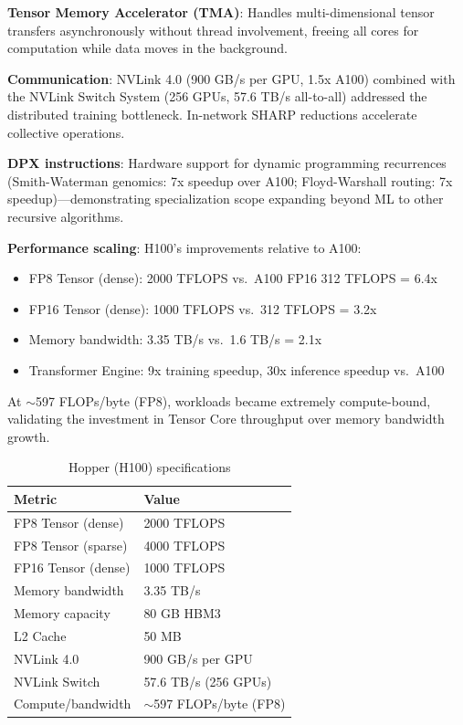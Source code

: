 \documentclass{article}
\begin{document}
\textbf{Tensor Memory Accelerator (TMA)}: Handles multi-dimensional tensor transfers asynchronously without thread involvement, freeing all cores for computation while data moves in the background.

\textbf{Communication}: NVLink 4.0 (900 GB/s per GPU, 1.5x A100) combined with the NVLink Switch System (256 GPUs, 57.6 TB/s all-to-all) addressed the distributed training bottleneck. In-network SHARP reductions accelerate collective operations.

\textbf{DPX instructions}: Hardware support for dynamic programming recurrences (Smith-Waterman genomics: 7x speedup over A100; Floyd-Warshall routing: 7x speedup)—demonstrating specialization scope expanding beyond ML to other recursive algorithms.

\textbf{Performance scaling}: H100's improvements relative to A100:
\begin{itemize}
\item FP8 Tensor (dense): 2000 TFLOPS vs.\ A100 FP16 312 TFLOPS = 6.4x
\item FP16 Tensor (dense): 1000 TFLOPS vs.\ 312 TFLOPS = 3.2x
\item Memory bandwidth: 3.35 TB/s vs.\ 1.6 TB/s = 2.1x
\item Transformer Engine: 9x training speedup, 30x inference speedup vs.\ A100 \cite{nvidia2022h100performance}
\end{itemize}
At $\sim$597 FLOPs/byte (FP8), workloads became extremely compute-bound, validating the investment in Tensor Core throughput over memory bandwidth growth.

\begin{table}[h]
\centering\small
\begin{tabular}{ll}
\toprule
Metric & Value \\
\midrule
FP8 Tensor (dense) & 2000 TFLOPS \\
FP8 Tensor (sparse) & 4000 TFLOPS \\
FP16 Tensor (dense) & 1000 TFLOPS \\
Memory bandwidth & 3.35 TB/s \\
Memory capacity & 80 GB HBM3 \\
L2 Cache & 50 MB \\
NVLink 4.0 & 900 GB/s per GPU \\
NVLink Switch & 57.6 TB/s (256 GPUs) \\
Compute/bandwidth & $\sim$597 FLOPs/byte (FP8) \\
\bottomrule
\end{tabular}
\caption{Hopper (H100) specifications}
\end{table}
\end{document}
